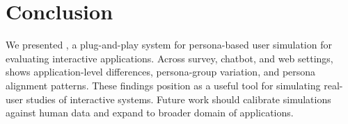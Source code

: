 \section{Conclusion}
\label{sec:conclusion}

We presented \method, a plug-and-play system for persona-based user simulation for evaluating interactive applications. Across survey, chatbot, and web settings, \method shows application-level differences, persona-group variation, and persona alignment patterns. These findings position \method as a useful tool for simulating real-user studies of interactive systems. Future work should calibrate simulations against human data and expand to broader domain of applications.